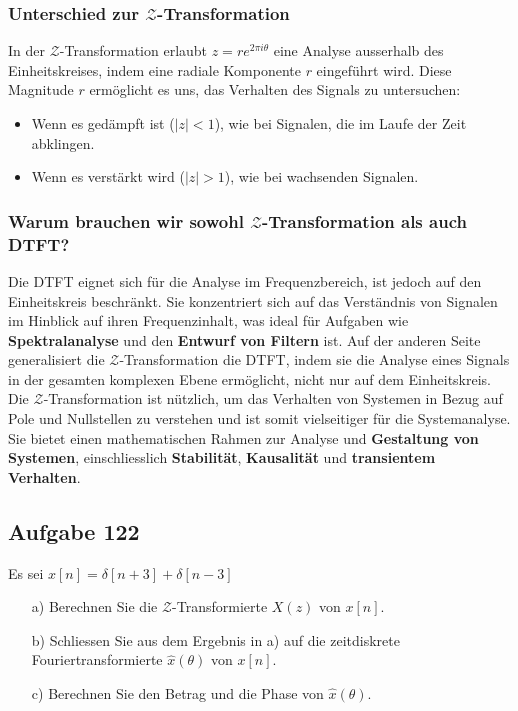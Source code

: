 \documentclass[11pt]{article}
\begin{document}
\vspace*{-0.5cm}
\subsubsection*{Unterschied zur $\mathcal{Z}$-Transformation}
\vspace*{-0.5cm}
In der $\mathcal{Z}$-Transformation erlaubt $z= r e^{2 \pi i \theta}$ eine Analyse ausserhalb des Einheitskreises, indem eine radiale Komponente $r$ eingeführt wird. Diese Magnitude $r$  ermöglicht es uns, das Verhalten des Signals zu untersuchen:
\vspace*{-0.5cm}
\begin{itemize}
    \item Wenn es gedämpft ist ($|z|<1$), wie bei Signalen, die im Laufe der Zeit abklingen.
    \item Wenn es verstärkt wird ($|z|>1$), wie bei wachsenden Signalen.
\end{itemize}

\vspace*{-0.5cm}
\subsubsection*{Warum brauchen wir sowohl $\mathcal{Z}$-Transformation als auch DTFT?}
\vspace*{-0.5cm}
Die DTFT eignet sich für die Analyse im Frequenzbereich, ist jedoch auf den Einheitskreis beschränkt. Sie konzentriert sich auf das Verständnis von Signalen im Hinblick auf ihren Frequenzinhalt, was ideal für Aufgaben wie \textbf{Spektralanalyse} und den \textbf{Entwurf von Filtern} ist. Auf der anderen Seite generalisiert die $\mathcal{Z}$-Transformation die DTFT, indem sie die Analyse eines Signals in der gesamten komplexen Ebene ermöglicht, nicht nur auf dem Einheitskreis. Die $\mathcal{Z}$-Transformation ist nützlich, um das Verhalten von Systemen in Bezug auf Pole und Nullstellen zu verstehen und ist somit vielseitiger für die Systemanalyse. Sie bietet einen mathematischen Rahmen zur Analyse und \textbf{Gestaltung von Systemen}, einschliesslich \textbf{Stabilität}, \textbf{Kausalität} und \textbf{transientem Verhalten}.

\subsection*{Aufgabe 122}
\vspace*{-0.5cm}
Es sei $x[n] = \delta[n+3] + \delta[n-3]$
\begin{itemize}
    \item[a)] Berechnen Sie die $\mathcal{Z}$-Transformierte $X(z)$ von $x[n]$.
    \item[b)] Schliessen Sie aus dem Ergebnis in a) auf die zeitdiskrete Fouriertransformierte $\hat{x}(\theta)$ von $x[n]$.
    \item[c)] Berechnen Sie den Betrag und die Phase von $\hat{x}(\theta)$.
\end{itemize}
\end{document}
